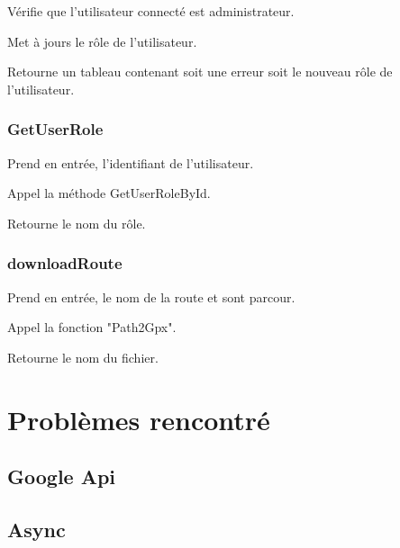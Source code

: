 \documentclass[a4paper]{article}
\newcommand{\rpi}{\emph{Raspbery Pi}}
\begin{document}
Vérifie que l'utilisateur connecté est administrateur.

Met à jours le rôle de l'utilisateur.

Retourne un tableau contenant soit une erreur soit le nouveau rôle de l'utilisateur.

\subsubsection{GetUserRole}
Prend en entrée, l'identifiant de l'utilisateur.

Appel la méthode GetUserRoleById.

Retourne le nom du rôle.

\subsubsection{downloadRoute}
Prend en entrée, le nom de la route et sont parcour.

Appel la fonction "Path2Gpx".

Retourne le nom du fichier.

\pagebreak

\section{Problèmes rencontré}
\subsection{Google Api}
\subsection{Async}

\end{document}
